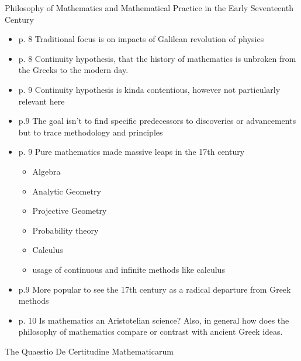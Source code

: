 \documentclass{report}
\begin{document}
{\large Philosophy of Mathematics and Mathematical Practice
in the Early Seventeenth Century}
\begin{itemize}
    \item p. 8 Traditional focus is on impacts of Galilean
        revolution of physics
    \item p. 8 Continuity hypothesis, that the history
        of mathematics is unbroken from the Greeks to the
        modern day.
    \item p. 9 Continuity hypothesis is kinda contentious,
        however not particularly relevant here
    \item p.9 The goal isn't to find specific predecessors
        to discoveries or advancements but to trace
        methodology and principles
    \item p. 9 Pure mathematics made massive leaps in
        the 17th century
        \begin{mdframed}
            \begin{itemize}
                \item Algebra
                \item Analytic Geometry
                \item Projective Geometry
                \item Probability theory
                \item Calculus
                \item usage of continuous and
                    infinite methods like calculus
            \end{itemize}
        \end{mdframed}
    \item p.9 More popular to see the 17th century as
        a radical departure from Greek methods
    \item p. 10 Is mathematics an Aristotelian science?
        Also, in general how does the philosophy of
        mathematics compare or
        contrast with ancient Greek ideas.
\end{itemize}
{\large The Quaestio De Certitudine Mathematicarum}
\end{document}
